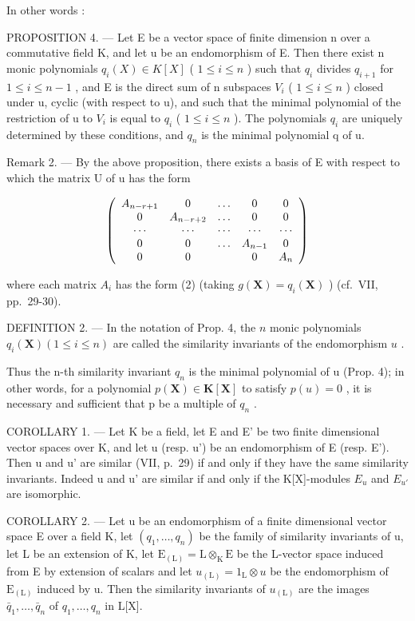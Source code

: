 In other words :

PROPOSITION 4. --- Let E be a vector space of finite dimension n over a commutative field K, and let u be an endomorphism of E. Then there exist n monic polynomials \(q_{i}(X) \in K[X]\) ( \(1 \leqslant i \leqslant n\) ) such that \(q_{i}\) divides \(q_{i+1}\) for \(1 \leqslant i \leqslant n-1\) , and E is the direct sum of n subspaces \(V_{i}\) ( \(1 \leqslant i \leqslant n\) ) closed under u, cyclic (with respect to u), and such that the minimal polynomial of the restriction of u to \(V_{i}\) is equal to \(q_{i}\) ( \(1 \leqslant i \leqslant n\) ). The polynomials \(q_{i}\) are uniquely determined by these conditions, and \(q_{n}\) is the minimal polynomial q of u.

Remark 2. --- By the above proposition, there exists a basis of E with respect to which the matrix U of u has the form

\[
\left( \begin{array}{c c c c c} A _ {n - r + 1} & 0 & \dots & 0 & 0 \\ 0 & A _ {n - r + 2} & \dots & 0 & 0 \\ \cdots & \cdots & \cdots & \cdots & \cdots \\ 0 & 0 & \dots & A _ {n - 1} & 0 \\ 0 & 0 & & 0 & A _ {n} \end{array} \right)
\]

where each matrix \(A_{i}\) has the form (2) (taking \(g(\mathbf{X}) = q_{i}(\mathbf{X})\) ) (cf.~VII, pp.~29-30).

DEFINITION 2. --- In the notation of Prop. 4, the \(n\) monic polynomials \(q_{i}(\mathbf{X}) (1 \leqslant i \leqslant n)\) are called the similarity invariants of the endomorphism \(u\) .

Thus the n-th similarity invariant \(q_{n}\) is the minimal polynomial of u (Prop. 4); in other words, for a polynomial \(p(\mathbf{X}) \in \mathbf{K}[\mathbf{X}]\) to satisfy \(p(u) = 0\) , it is necessary and sufficient that p be a multiple of \(q_{n}\) .

COROLLARY 1. --- Let K be a field, let E and E' be two finite dimensional vector spaces over K, and let u (resp. u') be an endomorphism of E (resp. E'). Then u and u' are similar (VII, p.~29) if and only if they have the same similarity invariants. Indeed u and u' are similar if and only if the K{[}X{]}-modules \(E_{u}\) and \(E_{u'}\) are isomorphic.

COROLLARY 2. --- Let u be an endomorphism of a finite dimensional vector space E over a field K, let \((q_{1}, \ldots, q_{n})\) be the family of similarity invariants of u, let L be an extension of K, let \(\mathrm{E}_{(\mathrm{L})} = \mathrm{L} \otimes_{\mathrm{K}} \mathrm{E}\) be the L-vector space induced from E by extension of scalars and let \(u_{(\mathrm{L})} = 1_{\mathrm{L}} \otimes u\) be the endomorphism of \(\mathrm{E}_{(\mathrm{L})}\) induced by u. Then the similarity invariants of \(u_{(\mathrm{L})}\) are the images \(\bar{q}_{1}, \ldots, \bar{q}_{n}\) of \(q_{1}, \ldots, q_{n}\) in L{[}X{]}.

